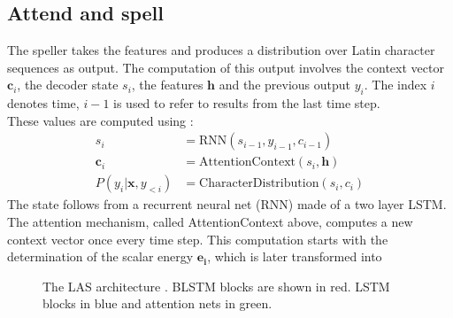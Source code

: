 \subsection{Attend and spell}
The speller takes the features and produces a distribution over Latin character sequences as output. The computation of this output involves the context vector $\mathbf{c}_i$, the decoder state $s_i$, the features $\mathbf{h}$ and the previous output $y_i$. The index $i$ denotes time, $i-1$ is used to refer to results from the last time step. \\
These values are computed using \cite[page 4]{Chan2015}:
\begin{align}
 s_i &= \text{RNN}(s_{i-1}, y_{i-1}, c_{i-1}) \\
 \mathbf{c}_i &= \text{AttentionContext}(s_i,\mathbf{h}) \\
  P(y_i|\mathbf{x}, y_{<i}) &= \text{CharacterDistribution}(s_i,c_i)  
\end{align}
The state follows from a recurrent neural net (RNN) made of a two layer LSTM. 
The attention mechanism, called AttentionContext above, computes a new context vector once every time step. 
This computation starts with the determination of the scalar energy $\mathbf{e_i}$, which is later transformed into  


\begin{figure}

\caption{The LAS architecture \cite[page 3]{Chan2015}. BLSTM blocks are shown in red. LSTM blocks in blue and attention nets in green.}
\label{fig:las}
\end{figure}
